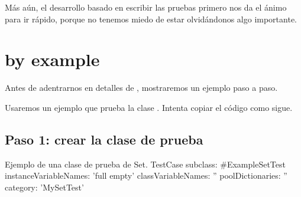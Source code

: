 \documentclass[a4paper,10pt,twoside]{book}
\begin{document}
M\'as a\'un, el desarrollo basado en escribir las pruebas primero nos da el \'animo para ir r\'apido, porque no tenemos miedo de estar olvid\'andonos algo importante.






\section{\sunit by example}

Antes de adentrarnos en detalles de \SUnit, mostraremos un ejemplo
paso a paso.

Usaremos un ejemplo que prueba la clase . Intenta copiar el c\'odigo como sigue.

\subsection{Paso 1: crear la clase de prueba}


\begin{classdef}[exampleSetTest]{Ejemplo de una clase de prueba de Set.}
TestCase subclass: #ExampleSetTest
	instanceVariableNames: 'full empty'
	classVariableNames: ''
	poolDictionaries: ''
	category: 'MySetTest'
\end{classdef}
\end{document}
